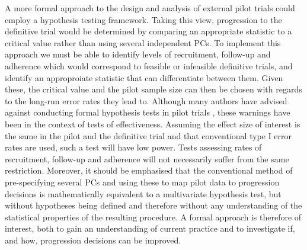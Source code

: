 \documentclass[AMA,STIX1COL]{WileyNJD-v2}
\begin{document}

A more formal approach to the design and analysis of external pilot trials could employ a hypothesis testing framework. Taking this view, progression to the definitive trial would be determined by comparing an appropriate statistic to a critical value rather than using several independent PCs. To implement this approach we must be able to  identify levels of recruitment, follow-up and adherence which would correspond to feasible or infeasible definitive trials, and identify an approproiate statistic that can differentiate between them. Given these, the critical value and the pilot sample size can then be chosen with regards to the long-run error rates they lead to. %
Although many authors have advised against conducting formal hypothesis tests in pilot trials \cite{Lancaster2004, Arain2010, Thabane2010, Eldridge2015}, these warnings have been in the context of tests of effectiveness. Assuming the effect size of interest is the same in the pilot and the definitive trial and that conventional type I error rates are used, such a test will have low power. Tests assessing rates of recruitment, follow-up and adherence will not necessarily suffer from the same restriction. Moreover, it should be emphasised that the conventional method of pre-specifying several PCs and using these to map pilot data to progression decisions is mathematically equivalent to a multivariate hypothesis test, but without hypotheses being defined and therefore without any understanding of the statistical properties of the resulting procedure. A formal approach is therefore of interest, both to gain an understanding of current practice and to investigate if, and how, progression decisions can be improved. %
\end{document}
